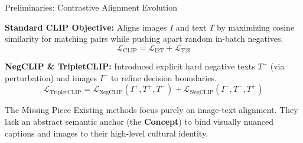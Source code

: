 \documentclass[aspectratio=169]{beamer}
\begin{document}
\begin{frame}{Preliminaries: Contrastive Alignment Evolution}
  
  \textbf{Standard CLIP Objective:}
  Aligns images $I$ and text $T$ by maximizing cosine similarity for matching pairs while pushing apart random in-batch negatives.
  $$ \mathcal{L}_{\text{CLIP}} = \mathcal{L}_{\text{I2T}} + \mathcal{L}_{\text{T2I}} $$
  
  \textbf{NegCLIP \& TripletCLIP:}
  Introduced explicit hard negative texts $T^-$ (via perturbation) and images $I^-$ to refine decision boundaries.
  $$ \mathcal{L}_{\text{TripletCLIP}} = \mathcal{L}_{\text{NegCLIP}}(I^+, T^+, T^-) + \mathcal{L}_{\text{NegCLIP}}(I^-, T^-, T^+) $$
  
  \begin{alertblock}{The Missing Piece}
  Existing methods focus purely on image-text alignment. They lack an abstract semantic anchor (the \textbf{Concept}) to bind visually nuanced captions and images to their high-level cultural identity.
  \end{alertblock}
  
\end{frame}
\end{document}
